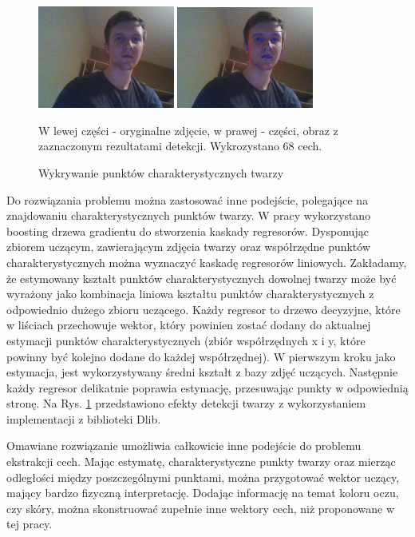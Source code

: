 \documentclass[oneside, eng]{mgr}
\begin{document}
\begin{figure}
\centering
	\includegraphics[width=0.40\textwidth,natwidth=310,natheight=642]{test.jpg}
	\includegraphics[width=0.40\textwidth,natwidth=310,natheight=642]{test_result.jpg}
\caption{Wykrywanie punktów charakterystycznych twarzy}
W lewej części - oryginalne zdjęcie, w prawej - części, obraz z zaznaczonym rezultatami detekcji. Wykrozystano 68 cech.
	\label{fig:face_landmark_detect}
\end{figure}

Do rozwiązania problemu można zastosować inne podejście, polegające na znajdowaniu charakterystycznych punktów twarzy. W pracy \cite{Landmark face detector} wykorzystano boosting drzewa gradientu do stworzenia kaskady regresorów. Dysponując zbiorem uczącym, zawierającym zdjęcia twarzy oraz współrzędne punktów charakterystycznych można wyznaczyć kaskadę regresorów liniowych. Zakładamy, że estymowany kształt punktów charakterystycznych dowolnej twarzy może być wyrażony jako kombinacja liniowa kształtu punktów charakterystycznych z odpowiednio dużego zbioru uczącego. Każdy regresor to drzewo decyzyjne, które w liściach przechowuje wektor, który powinien zostać dodany do aktualnej estymacji punktów charakterystycznych (zbiór współrzędnych x i y, które powinny być kolejno dodane do każdej współrzędnej). W pierwszym kroku jako estymacja, jest wykorzystywany średni kształt z bazy zdjęć uczących. Następnie każdy regresor delikatnie poprawia estymację, przesuwając punkty w odpowiednią stronę. Na Rys. \ref{fig:face_landmark_detect} przedstawiono efekty detekcji twarzy z wykorzystaniem implementacji z biblioteki Dlib.

Omawiane rozwiązanie umożliwia całkowicie inne podejście do problemu ekstrakcji cech. Mając estymatę, charakterystyczne punkty twarzy oraz mierząc odległości między poszczególnymi punktami, można przygotować wektor uczący, mający bardzo fizyczną interpretację. Dodając informację na temat koloru oczu, czy skóry, można skonstruować zupełnie inne wektory cech, niż proponowane w tej pracy. 
\end{document}

